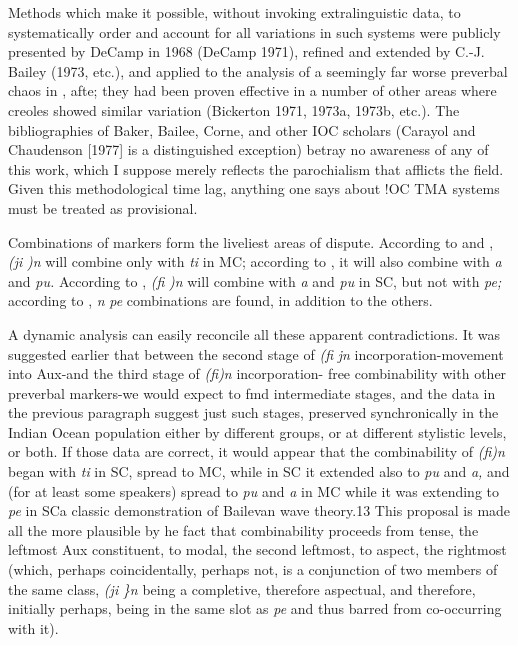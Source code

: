 
Methods which make it possible, without invoking extralinguistic data, to systematically order and account for all variations in such systems were publicly presented by DeCamp in 1968 (DeCamp 1971), refined and extended by C.-J. Bailey (1973, etc.), and applied to the analysis of a seemingly far worse preverbal chaos in \citet{Bickerton1975}, afte; they had been proven effective in a number of other areas where creoles showed similar variation (Bickerton 1971, 1973a, 1973b, etc.). The bibliographies of Baker, Bailee, Corne, and other IOC scholars (Carayol and Chaudenson [1977] is a distinguished exception) betray no awareness of any of this work, which I suppose merely reflects the parochialism that afflicts the field. Given this methodological time lag, anything one says about !OC TMA systems must be treated as provisional.

Combinations of markers form the liveliest areas of dispute. According to \citet{Baker1972} and \citet{Valdman1980}, \textit{(ji} \textit{)n} will combine only with \textit{ti} in MC; according to \citet{Moorghen1975}, it will also combine with \textit{a} and \textit{pu.} According to \citet{Bailee1977}, \textit{(fi} \textit{)n} will combine with \textit{a} and \textit{pu} in SC, but not with \textit{pe;} according to \citet{Corne1977}, \textit{n} \textit{pe} com\-binations are found, in addition to the others.

A dynamic analysis can easily reconcile all these apparent contradictions. It was suggested earlier that between the second stage of \textit{(fi} \textit{jn} incorporation-movement into Aux-and the third stage of \textit{(fi)n} incorporation- free combinability with other preverbal markers-we would expect to fmd intermediate stages, and the data in the previous paragraph suggest just such stages, preserved synchronically in the Indian Ocean population either by different groups, or at different stylistic levels, or both. If those data are correct, it would appear that the combinability of \textit{(fi)n} began with \textit{ti} in SC, spread to MC, while in SC it extended also to \textit{pu} and \textit{a,} and (for at least some speak\-ers) spread to \textit{pu }and \textit{a} in MC while it was extending to \textit{pe }in SC\-a classic demonstration of Bailevan wave theory.13 This proposal is made all the more plausible by he fact that combinability proceeds from tense, the leftmost Aux constituent, to modal, the second left\-most, to aspect, the rightmost (which, perhaps coincidentally, perhaps
not, is a conjunction of two members of the same class, \textit{(}\textit{ji} \textit{\}n }being a completive, therefore aspectual, and therefore, initially perhaps, being in the same slot as \textit{pe }and thus barred from co-occurring with it).

